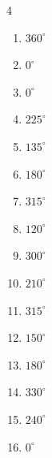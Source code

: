 \begin{multicols}{4}
\begin{enumerate}
  \item $\displaystyle 360^{\circ}$
        \phantom{$\displaystyle =2\pi$}

  \item $\displaystyle 0^{\circ}$
        \phantom{$\displaystyle =0$}

  \item $\displaystyle 0^{\circ}$
        \phantom{$\displaystyle =0$}

  \item $\displaystyle 225^{\circ}$

  \item $\displaystyle 135^{\circ}$

  \item $\displaystyle 180^{\circ}$
        \phantom{$\displaystyle =\pi$}

  \item $\displaystyle 315^{\circ}$

  \item $\displaystyle 120^{\circ}$

  \item $\displaystyle 300^{\circ}$

  \item $\displaystyle 210^{\circ}$

  \item $\displaystyle 315^{\circ}$

  \item $\displaystyle 150^{\circ}$

  \item $\displaystyle 180^{\circ}$
        \phantom{$\displaystyle =\pi$}

\columnbreak %

  \item $\displaystyle 330^{\circ}$

  \item $\displaystyle 240^{\circ}$

  \item $\displaystyle 0^{\circ}$
        \phantom{$\displaystyle =0$}


\end{enumerate}
\end{multicols}

